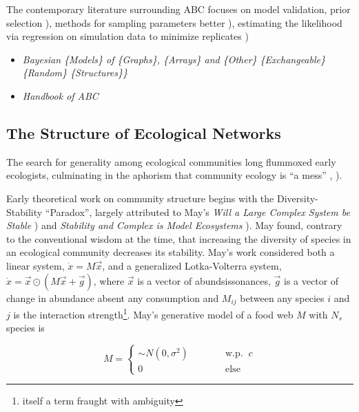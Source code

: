 \documentclass[]{article}
\begin{document}
The contemporary literature surrounding ABC focuses on model validation,
prior selection \citep{jacobs_unified_2014}), methods for sampling
parameters better \citep{beaumont_adaptive_2009}), estimating the
likelihood via regression on simulation data to minimize replicates
\citep{beaumont_approximate_2019})

\begin{itemize}
\item
  \emph{Bayesian \{Models\} of \{Graphs\}, \{Arrays\} and \{Other\}
  \{Exchangeable\} \{Random\} \{Structures\}\}}
  \citep{orbanz_bayesian_2015}
\item
  \emph{Handbook of ABC} \citep{sisson_handbook_2018}
\end{itemize}


\hypertarget{the-structure-of-ecological-networks}{%
\subsection{The Structure of Ecological
Networks}\label{the-structure-of-ecological-networks}}

The search for generality among ecological communities long flummoxed
early ecologists, culminating in the aphorism that community ecology is
``a mess'' \citep{citation_original}, \citep{citation_velland}).

Early theoretical work on community structure begins with the
Diversity-Stability ``Paradox'', largely attributed to May's \emph{Will
a Large Complex System be Stable} \citep{cite}) and \emph{Stability
and Complex is Model Ecosystems} \citep{cite}). May found, contrary
to the conventional wisdom at the time, that increasing the diversity of
species in an ecological community decreases its stability. May's work
considered both a linear system, \(\dot{x} = M\vec{x}\), and a
generalized Lotka-Volterra system,
\(\dot{x} = \vec{x} \odot (M \vec{x} + \vec{g})\), where \(\vec{x}\) is
a vector of abundsissonances, \(\vec{g}\) is a vector of change in abundance
absent any consumption and \(M_{ij}\) between any species \(i\) and
\(j\) is the interaction strength\footnote{itself a term fraught with
  ambiguity}. May's generative model of a food web \(M\) with \(N_s\)
species is

\[M = \begin{cases}\sim N(0, \sigma^2) \quad\quad\quad &\text{w.p. }\ c\\ 0 &\text{else}\end{cases}\]
\end{document}

